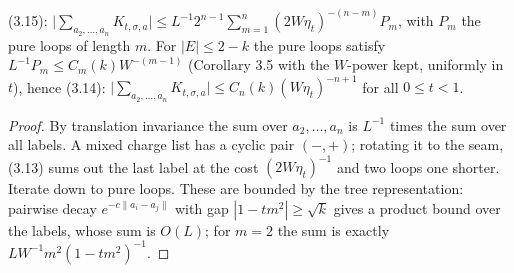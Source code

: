 \begin{corollary}[Corollary 3.7, (3.14)--(3.15)]\label{cor:3.7}
  \leanok
  (3.15): $\bigl|\sum_{a_2,\dots,a_n}K_{t,\sigma,a}\bigr|\le L^{-1}2^{n-1}
  \sum_{m=1}^n(2W\eta_t)^{-(n-m)}P_m$, with $P_m$ the pure loops of length $m$.
  For $|E|\le 2-k$ the pure loops satisfy $L^{-1}P_m\le C_m(k)W^{-(m-1)}$ (Corollary 3.5 with the
  $W$-power kept, uniformly in $t$), hence (3.14):
  $\bigl|\sum_{a_2,\dots,a_n}K_{t,\sigma,a}\bigr|\le C_n(k)(W\eta_t)^{-n+1}$ for all $0\le t<1$.
\end{corollary}
\begin{proof}\leanok{}
  By translation invariance the sum over $a_2,\dots,a_n$ is $L^{-1}$ times the sum over all
  labels.  A mixed charge list has a cyclic pair $(-,+)$; rotating it to the seam, (3.13)
  sums out the last label at the cost $(2W\eta_t)^{-1}$ and two loops one shorter.  Iterate
  down to pure loops.  These are bounded by the tree representation: pairwise decay
  $e^{-c\|a_i-a_j\|}$ with gap $|1-tm^2|\ge\sqrt k$ gives a product bound over the labels, whose
  sum is $O(L)$; for $m=2$ the sum is exactly $LW^{-1}m^2(1-tm^2)^{-1}$.
\end{proof}


